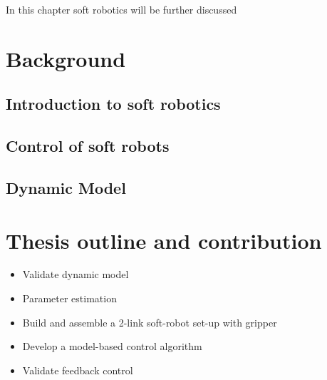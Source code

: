 In this chapter soft robotics will be further discussed



\section{Background}


\subsection{Introduction to soft robotics}


\subsection{Control of soft robots}




\subsection{Dynamic Model}



\section{Thesis outline and contribution}




\begin{itemize}
    \item Validate dynamic model
    \item Parameter estimation
    \item Build and assemble a 2-link soft-robot set-up with gripper
    \item Develop a model-based control algorithm
    \item Validate feedback control
\end{itemize}